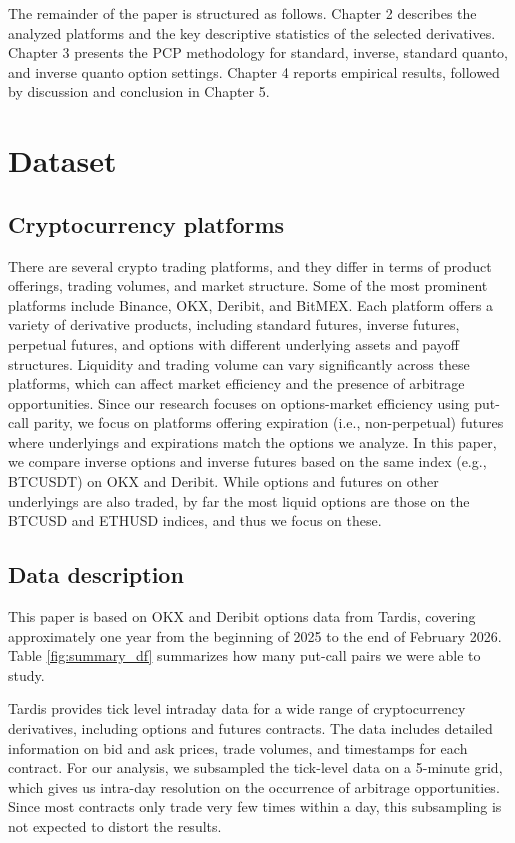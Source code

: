 \documentclass[12pt]{article}
\begin{document}
The remainder of the paper is structured as follows. Chapter 2 describes the analyzed platforms and the key descriptive statistics of the selected derivatives. Chapter 3 presents the PCP methodology for standard, inverse, standard quanto, and inverse quanto option settings. Chapter 4 reports empirical results, followed by discussion and conclusion in Chapter 5.

\section{Dataset}
\subsection{Cryptocurrency platforms}

There are several crypto trading platforms, and they differ in terms of product offerings, trading volumes, and market structure. Some of the most prominent platforms include Binance, OKX, Deribit, and BitMEX. Each platform offers a variety of derivative products, including standard futures, inverse futures, perpetual futures, and options with different underlying assets and payoff structures. Liquidity and trading volume can vary significantly across these platforms, which can affect market efficiency and the presence of arbitrage opportunities. Since our research focuses on options-market efficiency using put-call parity, we focus on platforms offering expiration (i.e., non-perpetual) futures where underlyings and expirations match the options we analyze. In this paper, we compare inverse options and inverse futures based on the same index (e.g., BTCUSDT) on OKX and Deribit. While options and futures on other underlyings are also traded, by far the most liquid options are those on the BTCUSD and ETHUSD indices, and thus we focus on these.

\subsection{Data description}

This paper is based on OKX and Deribit options data from Tardis, covering approximately one year from the beginning of 2025 to the end of February 2026. Table \ref{fig:summary_df} summarizes how many put-call pairs we were able to study.

Tardis provides tick level intraday data for a wide range of cryptocurrency derivatives, including options and futures contracts. The data includes detailed information on bid and ask prices, trade volumes, and timestamps for each contract. For our analysis, we subsampled the tick-level data on a 5-minute grid, which gives us intra-day resolution on the occurrence of arbitrage opportunities. Since most contracts only trade very few times within a day, this subsampling is not expected to distort the results.
\end{document}
